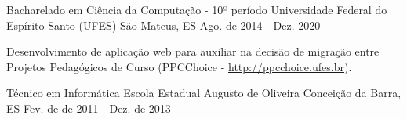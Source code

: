 

\begin{cventries}

  \cventry
    {Bacharelado em Ciência da Computação - 10º período} %
    {Universidade Federal do Espírito Santo (UFES)} %
    {São Mateus, ES} %
    {Ago. de 2014 - Dez. 2020} %
    {
      \begin{cvitems} %
        \item {Desenvolvimento de aplicação web para auxiliar na decisão de migração entre Projetos Pedagógicos de Curso (PPCChoice - \url{http://ppcchoice.ufes.br}).}
      \end{cvitems}
    }
  \cventry
{Técnico em Informática} %
{Escola Estadual Augusto de Oliveira} %
{Conceição da Barra, ES} %
{Fev. de de 2011 - Dez. de 2013} %
{
	      \begin{cvitems} %
	      \end{cvitems}
}

\end{cventries}
